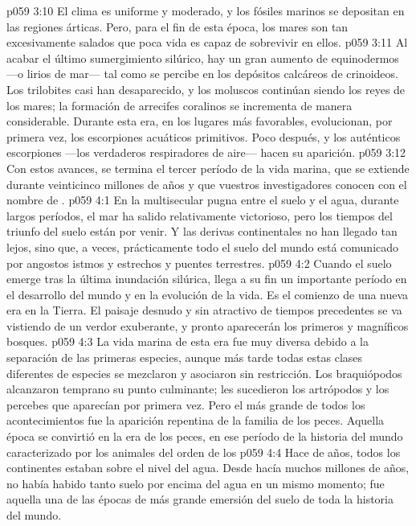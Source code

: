 \vs p059 3:10 El clima es uniforme y moderado, y los fósiles marinos se depositan en las regiones árticas. Pero, para el fin de esta época, los mares son tan excesivamente salados que poca vida es capaz de sobrevivir en ellos.
\vs p059 3:11 Al acabar el último sumergimiento silúrico, hay un gran aumento de equinodermos ---o lirios de mar--- tal como se percibe en los depósitos calcáreos de crinoideos. Los trilobites casi han desaparecido, y los moluscos continúan siendo los reyes de los mares; la formación de arrecifes coralinos se incrementa de manera considerable. Durante esta era, en los lugares más favorables, evolucionan, por primera vez, los escorpiones acuáticos primitivos. Poco después, y  los auténticos escorpiones ---los verdaderos respiradores de aire--- hacen su aparición.
\vs p059 3:12 Con estos avances, se termina el tercer período de la vida marina, que se extiende durante veinticinco millones de años y que vuestros investigadores conocen con el nombre de .
\vs p059 4:1 En la multisecular pugna entre el suelo y el agua, durante largos períodos, el mar ha salido relativamente victorioso, pero los tiempos del triunfo del suelo están por venir. Y las derivas continentales no han llegado tan lejos, sino que, a veces, prácticamente todo el suelo del mundo está comunicado por angostos istmos y estrechos y puentes terrestres.
\vs p059 4:2 Cuando el suelo emerge tras la última inundación silúrica, llega a su fin un importante período en el desarrollo del mundo y en la evolución de la vida. Es el comienzo de una nueva era en la Tierra. El paisaje desnudo y sin atractivo de tiempos precedentes se va vistiendo de un verdor exuberante, y pronto aparecerán los primeros y magníficos bosques.
\vs p059 4:3 La vida marina de esta era fue muy diversa debido a la separación de las primeras especies, aunque más tarde todas estas clases diferentes de especies se mezclaron y asociaron sin restricción. Los braquiópodos alcanzaron temprano su punto culminante; les sucedieron los artrópodos y los percebes que aparecían por primera vez. Pero el más grande de todos los acontecimientos fue la aparición repentina de la familia de los peces. Aquella época se convirtió en la era de los peces, en ese período de la historia del mundo caracterizado por los animales del orden de los 
\vs p059 4:4 \pc Hace  de años, todos los continentes estaban sobre el nivel del agua. Desde hacía muchos millones de años, no había habido tanto suelo por encima del agua en un mismo momento; fue aquella una de las épocas de más grande emersión del suelo de toda la historia del mundo.
